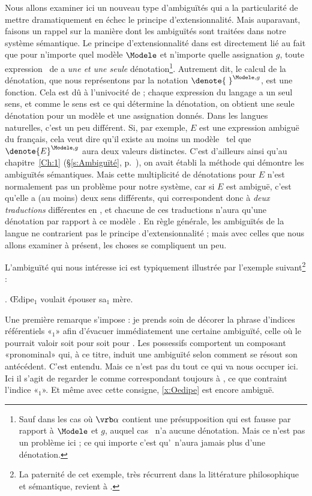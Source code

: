 Nous allons examiner ici un nouveau type d'ambiguïtés qui a la particularité de mettre dramatiquement en échec le principe d'extensionnalité. Mais auparavant, faisons un rappel sur la manière dont les ambiguïtés sont traitées dans notre système sémantique.
Le principe d'extensionnalité  dans {\LO} est directement lié au fait que pour n'importe quel modèle $\Modele$ et n'importe quelle assignation $g$, toute expression \vrb\alpha\ de {\LO} a \emph{une et une seule} dénotation\footnote{Sauf dans les cas où $\vrb\alpha$ contient une présupposition qui est fausse par rapport à $\Modele$ et $g$, auquel cas \vrb\alpha\ n'a aucune dénotation. Mais ce n'est pas un problème ici ; ce qui importe c'est qu'\vrb\alpha\ n'aura jamais plus d'une dénotation.}.  Autrement dit, le calcul de la dénotation, que nous représentons par la notation \(\denote{\;}^{\Modele,g}\), est une fonction.  Cela est dû à l'univocité de {\LO} ; chaque expression du langage a un seul sens, et comme le sens est ce qui détermine la dénotation, on obtient une seule dénotation pour un modèle et une assignation donnés. 
Dans les langues naturelles, c'est un peu différent. Si, par exemple, $E$ est une expression ambiguë du français, cela veut dire qu'il existe au moins un modèle \Modele\ tel que \(\denote{E}^{\Modele,g}\) aura deux valeurs distinctes.  C'est d'ailleurs ainsi qu'au chapitre~\ref{Ch:1} (\S\ref{s:Ambiguïté}, p.~\pageref{d:ambig}), on avait établi la méthode qui démontre les ambiguïtés sémantiques.
Mais cette multiplicité de dénotations pour $E$ n'est normalement pas un problème pour notre système, car si $E$ est ambiguë, c'est qu'elle a (au moins) deux sens différents, qui correspondent donc à \emph{deux traductions} différentes en {\LO}, et chacune de ces traductions n'aura qu'une dénotation par rapport à ce modèle \Modele.
En règle générale, les ambiguïtés de la langue ne contrarient pas le principe d'extensionnalité ; mais avec celles que nous allons examiner à présent, les choses se compliquent un peu.

L'ambiguïté qui nous intéresse ici est typiquement illustrée par l'exemple suivant\footnote{La paternité de cet exemple, très récurrent dans la littérature philosophique et sémantique, revient à \citet{Linsky:67}.} : %

\ex. \label{x:Oedipe}
{\OE}dipe$_1$ voulait épouser sa$_1$ mère.


Une première remarque s'impose : je prends soin de décorer la phrase d'indices référentiels «${}_1$» afin d'évacuer immédiatement une certaine ambiguïté, celle où le {\GN}  pourrait valoir soit pour  soit pour . Les {\GN} possessifs comportent un composant «pronominal» qui, à ce titre, induit une ambiguïté selon comment se résout son antécédent. C'est entendu. Mais ce n'est pas du tout ce qui va nous occuper ici. Ici il s'agit de regarder le {\GN}  comme correspondant toujours à , ce que contraint l'indice «${}_1$». Et même avec cette consigne, \ref{x:Oedipe} est encore ambiguë.

